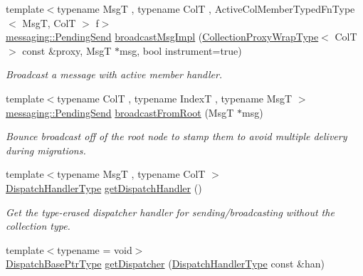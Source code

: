 \begin{DoxyCompactItemize}
{\footnotesize template$<$typename MsgT , typename ColT , Active\+Col\+Member\+Typed\+Fn\+Type$<$ Msg\+T, Col\+T $>$ f$>$ }\\\hyperlink{structvt_1_1messaging_1_1_pending_send}{messaging\+::\+Pending\+Send} \hyperlink{structvt_1_1vrt_1_1collection_1_1_collection_manager_ac7a9c72784d76ddf0346926bbb147e8c}{broadcast\+Msg\+Impl} (\hyperlink{structvt_1_1vrt_1_1collection_1_1_collection_manager_a56458ed7f9bb22b631b9b3a745f42f94}{Collection\+Proxy\+Wrap\+Type}$<$ ColT $>$ const \&proxy, MsgT $\ast$msg, bool instrument=true)
\begin{DoxyCompactList}\small\item\em Broadcast a message with active member handler. \end{DoxyCompactList}\item 
{\footnotesize template$<$typename ColT , typename IndexT , typename MsgT $>$ }\\\hyperlink{structvt_1_1messaging_1_1_pending_send}{messaging\+::\+Pending\+Send} \hyperlink{structvt_1_1vrt_1_1collection_1_1_collection_manager_a53567bdf285983b92dd4094721f8a4fd}{broadcast\+From\+Root} (MsgT $\ast$msg)
\begin{DoxyCompactList}\small\item\em Bounce broadcast off of the root node to stamp them to avoid multiple delivery during migrations. \end{DoxyCompactList}\item 
{\footnotesize template$<$typename MsgT , typename ColT $>$ }\\\hyperlink{structvt_1_1vrt_1_1collection_1_1_collection_manager_a0cfe02a0426e95ec9daa2ef7374e07c7}{Dispatch\+Handler\+Type} \hyperlink{structvt_1_1vrt_1_1collection_1_1_collection_manager_ab672ad6c3bc9fdc5a9577a9ae0677d1f}{get\+Dispatch\+Handler} ()
\begin{DoxyCompactList}\small\item\em Get the type-\/erased dispatcher handler for sending/broadcasting without the collection type. \end{DoxyCompactList}\item 
{\footnotesize template$<$typename  = void$>$ }\\\hyperlink{namespacevt_1_1vrt_1_1collection_aa3b9731ae16d60fac43d68840f3606a5}{Dispatch\+Base\+Ptr\+Type} \hyperlink{structvt_1_1vrt_1_1collection_1_1_collection_manager_af183a018e0d2d8b3ed024244d8f83f45}{get\+Dispatcher} (\hyperlink{structvt_1_1vrt_1_1collection_1_1_collection_manager_a0cfe02a0426e95ec9daa2ef7374e07c7}{Dispatch\+Handler\+Type} const \&han)

\end{DoxyCompactItemize}
